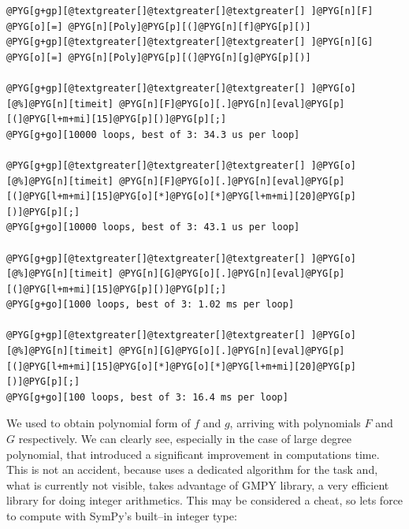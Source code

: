 \begin{Verbatim}[commandchars=@\[\]]
@PYG[g+gp][@textgreater[]@textgreater[]@textgreater[] ]@PYG[n][F] @PYG[o][=] @PYG[n][Poly]@PYG[p][(]@PYG[n][f]@PYG[p][)]
@PYG[g+gp][@textgreater[]@textgreater[]@textgreater[] ]@PYG[n][G] @PYG[o][=] @PYG[n][Poly]@PYG[p][(]@PYG[n][g]@PYG[p][)]

@PYG[g+gp][@textgreater[]@textgreater[]@textgreater[] ]@PYG[o][@%]@PYG[n][timeit] @PYG[n][F]@PYG[o][.]@PYG[n][eval]@PYG[p][(]@PYG[l+m+mi][15]@PYG[p][)]@PYG[p][;]
@PYG[g+go][10000 loops, best of 3: 34.3 us per loop]

@PYG[g+gp][@textgreater[]@textgreater[]@textgreater[] ]@PYG[o][@%]@PYG[n][timeit] @PYG[n][F]@PYG[o][.]@PYG[n][eval]@PYG[p][(]@PYG[l+m+mi][15]@PYG[o][*]@PYG[o][*]@PYG[l+m+mi][20]@PYG[p][)]@PYG[p][;]
@PYG[g+go][10000 loops, best of 3: 43.1 us per loop]

@PYG[g+gp][@textgreater[]@textgreater[]@textgreater[] ]@PYG[o][@%]@PYG[n][timeit] @PYG[n][G]@PYG[o][.]@PYG[n][eval]@PYG[p][(]@PYG[l+m+mi][15]@PYG[p][)]@PYG[p][;]
@PYG[g+go][1000 loops, best of 3: 1.02 ms per loop]

@PYG[g+gp][@textgreater[]@textgreater[]@textgreater[] ]@PYG[o][@%]@PYG[n][timeit] @PYG[n][G]@PYG[o][.]@PYG[n][eval]@PYG[p][(]@PYG[l+m+mi][15]@PYG[o][*]@PYG[o][*]@PYG[l+m+mi][20]@PYG[p][)]@PYG[p][;]
@PYG[g+go][100 loops, best of 3: 16.4 ms per loop]
\end{Verbatim}
\noindent
We used  to obtain polynomial form of $f$ and $g$, arriving with polynomials $F$
and $G$ respectively. We can clearly see, especially in the case of large degree polynomial,
that \href{http://docs.python.org/library/functions.html\#eval}{} introduced a significant improvement in computations time. This is not an
accident, because \href{http://docs.python.org/library/functions.html\#eval}{} uses a dedicated algorithm for the task and, what is currently
not visible, takes advantage of GMPY library, a very efficient library for doing integer
arithmetics. This may be considered a cheat, so lets force  to compute with
SymPy's built--in integer type:

